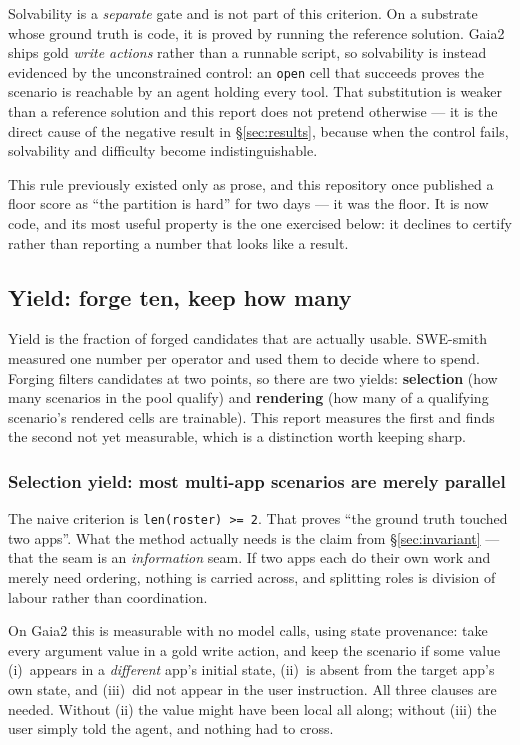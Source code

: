 \documentclass[11pt,a4paper]{article}
\begin{document}
Solvability is a \emph{separate} gate and is not part of this criterion. On a substrate whose ground truth is code, it is proved by running the reference solution. Gaia2 ships gold \emph{write actions} rather than a runnable script, so solvability is instead evidenced by the unconstrained control: an \texttt{open} cell that succeeds proves the scenario is reachable by an agent holding every tool. That substitution is weaker than a reference solution and this report does not pretend otherwise --- it is the direct cause of the negative result in \S\ref{sec:results}, because when the control fails, solvability and difficulty become indistinguishable.

This rule previously existed only as prose, and this repository once published a floor score as ``the partition is hard'' for two days --- it was the floor. It is now code, and its most useful property is the one exercised below: it declines to certify rather than reporting a number that looks like a result.

\subsection{Yield: forge ten, keep how many}
\label{sec:yield}

Yield is the fraction of forged candidates that are actually usable. SWE-smith measured one number per operator and used them to decide where to spend. Forging filters candidates at two points, so there are two yields: \textbf{selection} (how many scenarios in the pool qualify) and \textbf{rendering} (how many of a qualifying scenario's rendered cells are trainable). This report measures the first and finds the second not yet measurable, which is a distinction worth keeping sharp.

\subsubsection*{Selection yield: most multi-app scenarios are merely parallel}

The naive criterion is \texttt{len(roster) >= 2}. That proves ``the ground truth touched two apps''. What the method actually needs is the claim from \S\ref{sec:invariant} --- that the seam is an \emph{information} seam. If two apps each do their own work and merely need ordering, nothing is carried across, and splitting roles is division of labour rather than coordination.

On Gaia2 this is measurable with no model calls, using state provenance: take every argument value in a gold write action, and keep the scenario if some value (i)~appears in a \emph{different} app's initial state, (ii)~is absent from the target app's own state, and (iii)~did not appear in the user instruction. All three clauses are needed. Without (ii) the value might have been local all along; without (iii) the user simply told the agent, and nothing had to cross.
\end{document}
